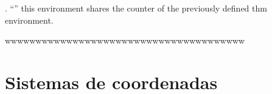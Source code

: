 \documentclass[a4paper]{report}
\begin{document}
\cite{hilbert2020geometry}. ``''  this environment shares the counter of the previously defined thm environment.
\cite{reyes} \cite{www}


wwwwwwwwwwwwwwwwwwwwwwwwwwwwwwwwwwwwwww







\printindex


\appendix
{}
\setcounter{page}{1}
\chapter{Sistemas de coordenadas}
\end{document}
